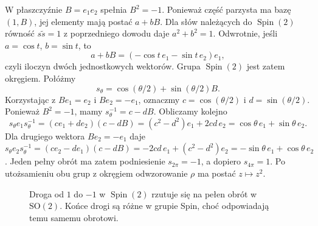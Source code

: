 \begin{przyklad}
\label{prz:lin31-spin2}
W płaszczyźnie $B=e_1e_2$ spełnia $B^2=-1$.
Ponieważ część parzysta ma bazę $(1,B)$,
jej elementy mają postać $a+bB$. Dla słów
należących do $\operatorname{Spin}(2)$ równość
$s\widetilde s=1$ z poprzedniego dowodu daje
$a^2+b^2=1$. Odwrotnie, jeśli
$a=\cos t$, $b=\sin t$, to
\[
 a+bB=(-\cos t\,e_1-\sin t\,e_2)e_1,
\]
czyli iloczyn dwóch jednostkowych wektorów.
Grupa $\operatorname{Spin}(2)$ jest zatem okręgiem.
Połóżmy
\[
 s_\theta=\cos(\theta/2)+\sin(\theta/2)B.
\]
Korzystając z $Be_1=e_2$ i $Be_2=-e_1$,
oznaczmy $c=\cos(\theta/2)$ i $d=\sin(\theta/2)$.
Ponieważ $B^2=-1$, mamy $s_\theta^{-1}=c-dB$.
Obliczamy kolejno
\[
 s_\theta e_1s_\theta^{-1}
 =(ce_1+de_2)(c-dB)
 =(c^2-d^2)e_1+2cd\,e_2
 =\cos\theta\,e_1+\sin\theta\,e_2.
\]
Dla drugiego wektora $Be_2=-e_1$ daje
$s_\theta e_2s_\theta^{-1}
=(ce_2-de_1)(c-dB)
=-2cd\,e_1+(c^2-d^2)e_2
=-\sin\theta\,e_1+\cos\theta\,e_2$.
Jeden pełny obrót ma zatem podniesienie
$s_{2\pi}=-1$, a dopiero $s_{4\pi}=1$.
Po utożsamieniu obu grup z okręgiem odwzorowanie
$\rho$ ma postać $z\mapsto z^2$.
\end{przyklad}

\begin{figure}[!htbp]
\centering
{}
\caption{Droga od $1$ do $-1$ w $\operatorname{Spin}(2)$
rzutuje się na pełen obrót w $\mathrm{SO}(2)$.
Końce drogi są różne w grupie Spin, choć odpowiadają
temu samemu obrotowi.}
\label{fig:lin31-spin-dwukrotne}
\end{figure}


